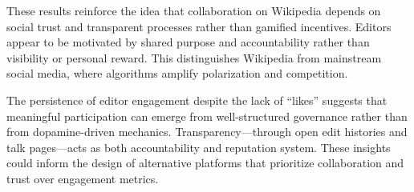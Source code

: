 
\label{sec:discussion}
These results reinforce the idea that collaboration on Wikipedia depends on social trust and transparent processes rather than gamified incentives. Editors appear to be motivated by shared purpose and accountability rather than visibility or personal reward. This distinguishes Wikipedia from mainstream social media, where algorithms amplify polarization and competition.

The persistence of editor engagement despite the lack of “likes” suggests that meaningful participation can emerge from well-structured governance rather than from dopamine-driven mechanics. Transparency—through open edit histories and talk pages—acts as both accountability and reputation system. These insights could inform the design of alternative platforms that prioritize collaboration and trust over engagement metrics.

